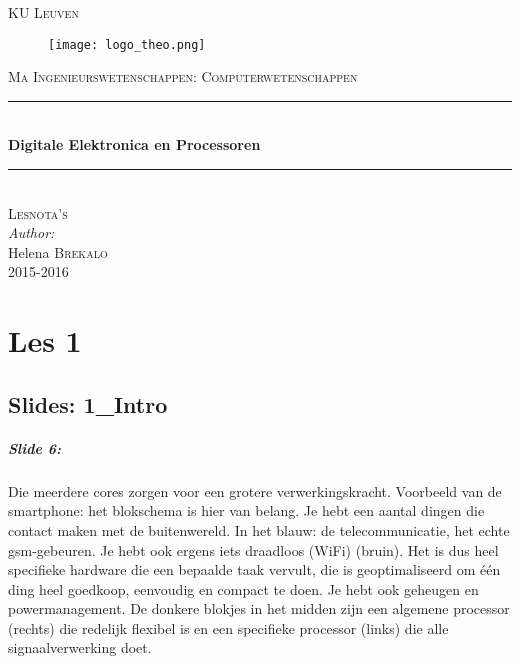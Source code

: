 \documentclass[10pt,a4paper]{book}
\author{Helena Brekalo}
\begin{document}
\begin{titlepage}

\newcommand{\HRule}{\rule{\linewidth}{0.5mm}} %

\center %
 
\textsc{\LARGE KU Leuven}\\[1.5cm] %

\begin{figure}[ht!]
\centering
\texttt{[image: logo\_theo.png]}
\label{kulogo}
\end{figure}

\textsc{\Large Ma Ingenieurswetenschappen: Computerwetenschappen}\\[0.5cm] %


\HRule \\[0.4cm]
{ \huge \bfseries Digitale Elektronica en Processoren}\\[0.4cm]
\HRule \\[1.5cm]


\textsc{\Large Lesnota's}\\[0.5cm] %


\large \emph{Author:}\\
Helena \textsc{Brekalo}\\[3cm]

{\large 2015-2016}\\[3cm] %

\vfill %

\end{titlepage}

\tableofcontents
\clearpage

\chapter{Les 1}
\section{Slides: 1\_Intro}

\paragraph{Slide 6:} Die meerdere cores zorgen voor een grotere verwerkingskracht. Voorbeeld van de smartphone: het blokschema is hier van belang. Je hebt een aantal dingen die contact maken met de buitenwereld. In het blauw: de telecommunicatie, het echte gsm-gebeuren. Je hebt ook ergens iets draadloos (WiFi) (bruin). Het is dus heel specifieke hardware die een bepaalde taak vervult, die is geoptimaliseerd om \'e\'en ding heel goedkoop, eenvoudig en compact te doen. Je hebt ook geheugen en powermanagement. De donkere blokjes in het midden zijn een algemene processor (rechts) die redelijk flexibel is en een specifieke processor (links) die alle signaalverwerking doet.
\end{document}
